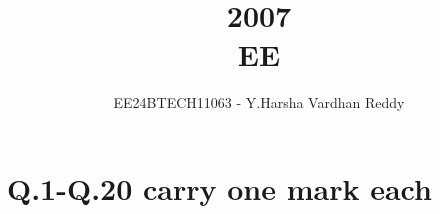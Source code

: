 \documentclass[journal]{IEEEtran}
\renewcommand{\thefigure}{\theenumi}
\renewcommand{\thetable}{\theenumi}
\numberwithin{equation}{enumi}
\numberwithin{figure}{enumi}
\renewcommand{\thetable}{\theenumi}
\begin{document}

\vspace{3cm}

\title{2007\\EE}
\author{EE24BTECH11063 - Y.Harsha Vardhan Reddy}
{\let\newpage\relax\maketitle}
\renewcommand{\thefigure}{\theenumi}
\renewcommand{\thetable}{\theenumi}

\section*{Q.1-Q.20 carry one mark each}
\end{document}
